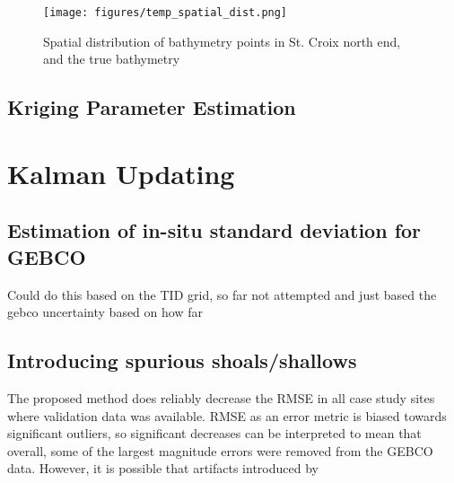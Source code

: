 \begin{figure}[h!]
    \centering
    \texttt{[image: figures/temp\_spatial\_dist.png]}
    \caption{Spatial distribution of bathymetry points in St. Croix north end, and the true bathymetry}
    \label{fig:distribution-of-bathy-points-in-space}
\end{figure}

\subsection{Kriging Parameter Estimation}


\section{Kalman Updating}


\subsection{Estimation of in-situ standard deviation for GEBCO}


Could do this based on the TID grid, so far not attempted and just based the gebco uncertainty based on how far 

\subsection{Introducing spurious shoals/shallows}
The proposed method does reliably decrease the RMSE in all case study sites where validation data was available. RMSE as an error metric is biased towards significant outliers, so significant decreases can be interpreted to mean that overall, some of the largest magnitude errors were removed from the GEBCO data. However, it is possible that artifacts introduced by  